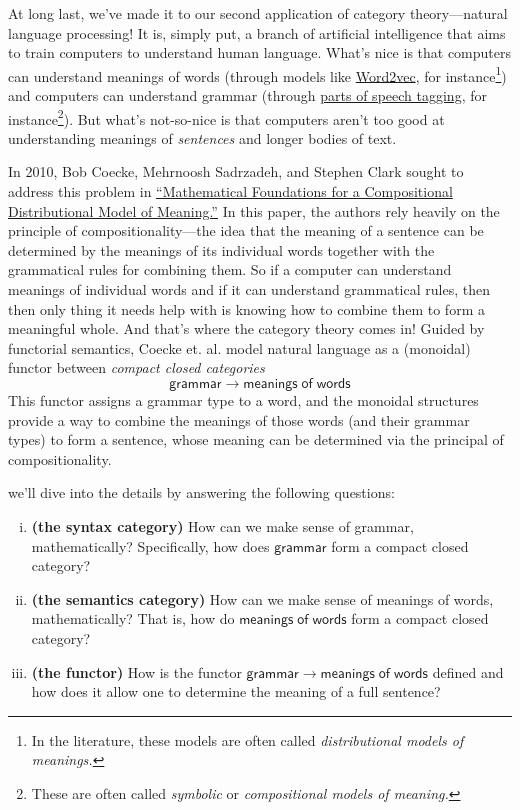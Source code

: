 \documentclass{tufte-handout-tai}
\theoremstyle{plain}
\theoremstyle{definition}
\theoremstyle{remark}
\begin{document}
At long last, we've made it to our second application of category theory---natural language processing! It is, simply put, a branch of artificial intelligence that aims to train computers to understand human language. What's nice is that computers can understand meanings of words (through models like \href{https://en.wikipedia.org/wiki/Word2vec}{Word2vec}, for instance\footnote{In the literature, these models are often called \textit{distributional models of meanings.}}) and computers can understand grammar (through \href{https://en.wikipedia.org/wiki/Part-of-speech_tagging}{parts of speech tagging}, for instance\footnote{These are often called \textit{symbolic} or \textit{compositional models of meaning.}}). But what's not-so-nice is that computers aren't too good at understanding meanings of \textit{sentences} and longer bodies of text.

In 2010, Bob Coecke, Mehrnoosh Sadrzadeh, and Stephen Clark sought to address this problem in \href{https://arxiv.org/abs/1003.4394}{``Mathematical Foundations for a Compositional Distributional Model of Meaning.''} In this paper, the authors rely heavily on the principle of compositionality---the idea that the meaning of a sentence can be determined by the meanings of its individual words together with the grammatical rules for combining them. So if a computer can understand meanings of individual words and if it can understand grammatical rules, then then only thing it needs help with is knowing how to combine them to form a meaningful whole. And that's where the category theory comes in! Guided by functorial semantics, Coecke et. al. model natural language as a (monoidal) functor between \textit{compact closed categories}
\[\mathsf{grammar}\to\mathsf{meanings\;of\;words}\]
This functor assigns a grammar type to a word, and the monoidal structures provide a way to combine the meanings of those words (and their grammar types) to form a sentence, whose meaning can be determined via the principal of compositionality.

 we'll dive into the details by answering the following questions:
	\begin{enumerate}[i.]
	\item \textbf{(the syntax category)} How can we make sense of grammar, mathematically? Specifically, how does $\mathsf{grammar}$ form a compact closed category?
	\item \textbf{(the semantics category)} How can we make sense of meanings of words, mathematically? That is, how do $\mathsf{meanings\;of\;words}$ form a compact closed category?
	\item \textbf{(the functor)} How is the functor $\mathsf{grammar}\to\mathsf{meanings\;of\;words}$ defined and how does it allow one to determine the meaning of a full sentence?
	\end{enumerate}
\end{document}
